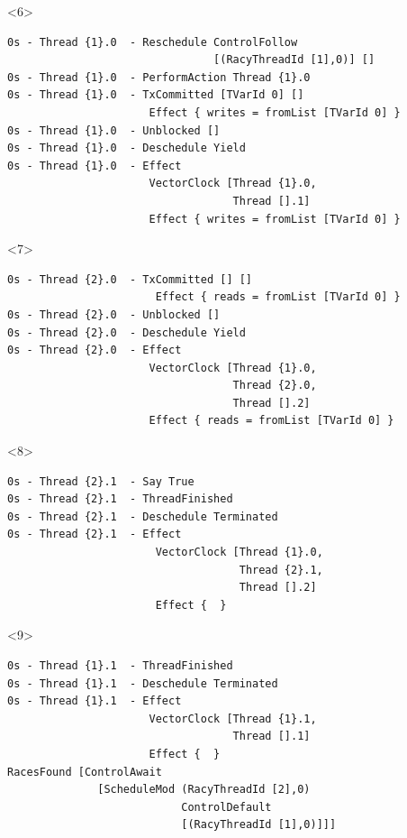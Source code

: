 \documentclass[t,x11names,xcolor={x11names},hyperref={colorlinks,citecolor=Blue4,linkcolor=Blue4,anchorcolor=Blue4,urlcolor=Blue4}]{beamer}
\begin{document}
\begin{frame}[fragile]
\begin{columns}
\begin{column}{0.6\textwidth}
\begin{onlyenv}
      \end{onlyenv}
      \begin{onlyenv}<6>
        \begin{verbatim}
0s - Thread {1}.0  - Reschedule ControlFollow
                                [(RacyThreadId [1],0)] []
0s - Thread {1}.0  - PerformAction Thread {1}.0
0s - Thread {1}.0  - TxCommitted [TVarId 0] []
                      Effect { writes = fromList [TVarId 0] }
0s - Thread {1}.0  - Unblocked []
0s - Thread {1}.0  - Deschedule Yield
0s - Thread {1}.0  - Effect
                      VectorClock [Thread {1}.0,
                                   Thread [].1]
                      Effect { writes = fromList [TVarId 0] }
        \end{verbatim}
      \end{onlyenv}
      \begin{onlyenv}<7>
        \begin{verbatim}
0s - Thread {2}.0  - TxCommitted [] []
                       Effect { reads = fromList [TVarId 0] }
0s - Thread {2}.0  - Unblocked []
0s - Thread {2}.0  - Deschedule Yield
0s - Thread {2}.0  - Effect
                      VectorClock [Thread {1}.0,
                                   Thread {2}.0,
                                   Thread [].2]
                      Effect { reads = fromList [TVarId 0] }
        \end{verbatim}
      \end{onlyenv}
      \begin{onlyenv}<8>
        \begin{verbatim}
0s - Thread {2}.1  - Say True
0s - Thread {2}.1  - ThreadFinished
0s - Thread {2}.1  - Deschedule Terminated
0s - Thread {2}.1  - Effect
                       VectorClock [Thread {1}.0,
                                    Thread {2}.1,
                                    Thread [].2]
                       Effect {  }
        \end{verbatim}
      \end{onlyenv}
      \begin{onlyenv}<9>
        \begin{verbatim}
0s - Thread {1}.1  - ThreadFinished
0s - Thread {1}.1  - Deschedule Terminated
0s - Thread {1}.1  - Effect
                      VectorClock [Thread {1}.1,
                                   Thread [].1]
                      Effect {  }
RacesFound [ControlAwait
              [ScheduleMod (RacyThreadId [2],0)
                           ControlDefault
                           [(RacyThreadId [1],0)]]]

\end{verbatim}
\end{onlyenv}
\end{column}
\end{columns}
\end{frame}
\end{document}
